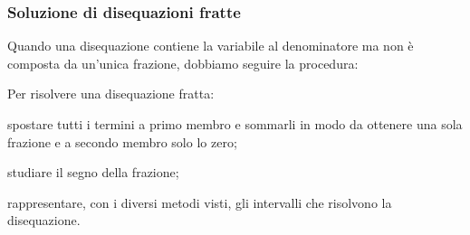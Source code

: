 \subsubsection{Soluzione di disequazioni fratte}

Quando una disequazione contiene la variabile al denominatore ma non è composta
da un'unica frazione, dobbiamo seguire la procedura:

\begin{procedura}
 Per risolvere una disequazione fratta:
\begin{enumeratea}
 \item spostare tutti i termini a primo membro e sommarli in modo da ottenere 
 una sola frazione e a secondo membro solo lo zero;
 \item studiare il segno della frazione;
 \item rappresentare, con i diversi metodi visti, 
  gli intervalli che risolvono la disequazione.
\end{enumeratea}
\end{procedura}

